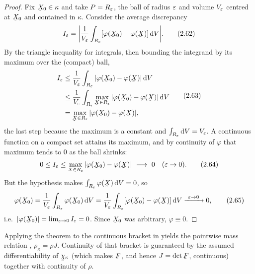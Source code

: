 \begin{proof}
Fix $\bX_0\in\kappa$ and take $P=R_\varepsilon$, the ball of radius $\varepsilon$ and
volume $V_\varepsilon$ centred at $\bX_0$ and contained in $\kappa$. Consider the
average discrepancy
\begin{equation}
   I_\eps=\bigg|\frac{1}{V_\eps}\int_{R_\eps}[\varphi(\bX_0)-\varphi(\bX)]\,\dl V\bigg|.
   \tag{2.62}\label{eq:2.62}
\end{equation}
By the triangle inequality for integrals, then bounding the integrand by its
maximum over the (compact) ball,
\begin{equation}
\begin{aligned}
   I_\eps&\le\frac{1}{V_\eps}\int_{R_\eps}|\varphi(\bX_0)-\varphi(\bX)|\,\dl V\\
   &\le\frac{1}{V_\eps}\int_{R_\eps}\max_{\bX\in R_\eps}
       |\varphi(\bX_0)-\varphi(\bX)|\,\dl V\\
   &=\max_{\bX\in R_\eps}|\varphi(\bX_0)-\varphi(\bX)|,
\end{aligned}
\tag{2.63}\label{eq:2.63}
\end{equation}
the last step because the maximum is a constant and $\int_{R_\varepsilon}\mathrm{d} V=V_\varepsilon$.
A continuous function on a compact set attains its maximum, and by continuity
of $\varphi$ that maximum tends to $0$ as the ball shrinks:
\begin{equation}
   0\le I_\eps\le\max_{\bX\in R_\eps}|\varphi(\bX_0)-\varphi(\bX)|\ \longrightarrow\ 0
   \quad(\eps\to0). \tag{2.64}\label{eq:2.64}
\end{equation}
But the hypothesis  makes $\int_{R_\eps}\varphi(\bX)\,\dl V=0$, so
\begin{equation}
   \varphi(\bX_0)=\frac{1}{V_\eps}\int_{R_\eps}\varphi(\bX_0)\,\dl V
   =\frac{1}{V_\eps}\int_{R_\eps}[\varphi(\bX_0)-\varphi(\bX)]\,\dl V
   \xrightarrow{\ \eps\to0\ }0, \tag{2.65}\label{eq:2.65}
\end{equation}
i.e.\ $|\varphi(\bX_0)|=\lim_{\eps\to0}I_\eps=0$. Since $\bX_0$ was
arbitrary, $\varphi\equiv0$.
\end{proof}

Applying the theorem to the continuous bracket in  yields the
pointwise mass relation , $\rho_\kappa=\rho J$. Continuity of that
bracket is guaranteed by the assumed differentiability of $\bchi_\kappa$
(which makes $\bF$, and hence $J=\det\bF$, continuous) together with
continuity of $\rho$.

